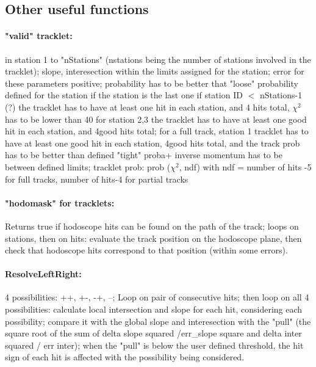 \documentclass[11pt]{article}
\begin{document}
\subsection{Other useful functions}

\paragraph{"valid" tracklet:}
        in station 1 to "nStations" (nstations being the number of stations involved in the tracklet); 
        slope, interesection within the limits assigned for the station; 
        error for these parameters positive;
        probability has to be better that "loose" probability defined for the station if the station is the last one
        if station ID $<$ nStations-1 (?) the tracklet has to have at least one hit in each station, and 4 hits total, $\chi^2$ has to be lower than 40
        for station 2,3  the tracklet has to have at least one good hit in each station, and 4good  hits total;
        for a full track, station 1 tracklet has to have at least one good hit in each station, 4good hits total, and the track prob has to be better than defined "tight" proba+ inverse momentum has to be between defined limits;
    tracklet prob: prob ($\chi^2$, ndf) with ndf = number of hits -5 for full tracks, number of hits-4 for partial tracks 
\paragraph{"hodomask" for tracklets:}
Returns true if hodoscope hits can be found on the path of the track;
loops on stations, then on hits: evaluate the track position on the hodoscope plane, then check that hodoscope hits correspond to that position (within some errors).
\paragraph{ResolveLeftRight:}
4 possibilities: ++, +-, -+, --;
Loop on pair of consecutive hits; then loop on all 4 possibilities:  calculate local intersection and slope for each hit, considering each possibility; compare it with the global slope and interesection with the "pull" (the square root of the sum of delta slope squared /err\_slope square and delta inter squared / err inter); 
when the "pull" is below the user defined threshold, the hit sign of each hit is affected with the possibility being considered.

\newpage
        
%
%
%
%
%
\end{document}
